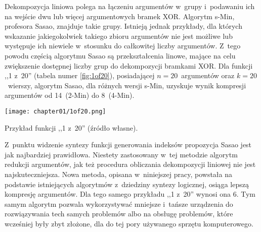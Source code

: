 Dekompozycja liniowa polega na łączeniu argumentów w~grupy i~podawaniu ich na wejście dwu lub więcej argumentowych bramek XOR.
Algorytm s-Min, profesora Sasao, znajduje takie grupy.
Istnieją jednak przykłady,
dla których wskazanie jakiegokolwiek takiego zbioru argumentów nie jest możliwe lub występuje ich niewiele w~stosunku do całkowitej liczby argumentów.
Z~tego powodu częścią algorytmu Sasao są przekształcenia linowe,
mające na celu zwiększenie dostępnej liczby grup do dekompozycji bramkami XOR.
Dla funkcji ,,1 z~20'' (tabela numer \ref{fig:1of20}),
posiadającej $n=20$~argumentów oraz $k=20$~wierszy,
algorytm Sasao,
dla różnych wersji s-Min,
uzyskuje wynik kompresji argumentów od 14~(2-Min) do 8~(4-Min).

\begin{table}
\centering
\texttt{[image: chapter01/1of20.png]}
\caption{Przykład funkcji ,,1 z~20'' (źródło własne).}
\label{fig:1of20}
\end{table}

Z~punktu widzenie syntezy funkcji generowania indeksów propozycja Sasao jest jak najbardziej prawidłowa.
Niestety zastosowany w~tej metodzie algorytm redukcji argumentów,
jak też procedura obliczania dekompozycji liniowej nie jest najskuteczniejsza.
Nowa metoda,
opisana w~niniejszej pracy,
powstała na podstawie istniejących algorytmów z~dziedziny syntezy logicznej,
osiąga lepszą kompresję argumentów.
Dla tego samego przykładu ,,1 z~20'' wynosi ona 6.
Tym samym algorytm pozwala wykorzystywać mniejsze i~tańsze urządzenia do rozwiązywania tech samych problemów
albo na obsługę problemów, które wcześniej były zbyt złożone,
dla do tej pory używanego sprzętu komputerowego.



